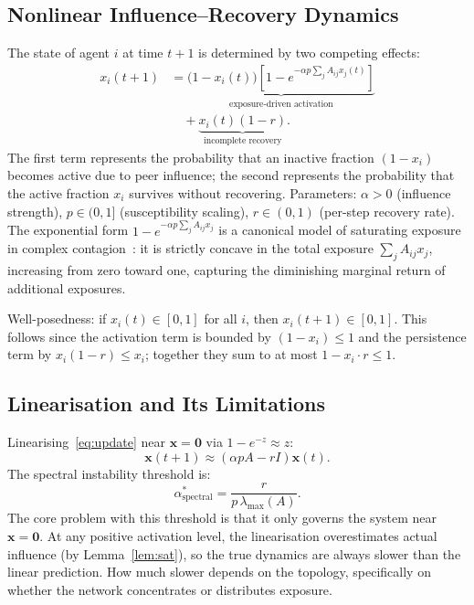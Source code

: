 \documentclass[10pt,twocolumn]{article}
\theoremstyle{myproof}
\newcommand{\lmax}{\lambda_{\max}}
\begin{document}
\subsection{Nonlinear Influence--Recovery Dynamics}
\label{ssec:dynamics}
The state of agent $i$ at time $t+1$ is determined by two competing effects:
\begin{align}
\label{eq:update}
  x_i(t{+}1)&=\underbrace{\bigl(1-x_i(t)\bigr)\!\left[1-e^{-\alpha p\sum_j A_{ij}x_j(t)}\right]}_{\text{exposure-driven activation}} \nonumber\\
  &\quad+\underbrace{x_i(t)(1-r)}_{\text{incomplete recovery}}.
\end{align}
The first term represents the probability that an inactive fraction $(1-x_i)$ becomes active due
to peer influence; the second represents the probability that the active fraction $x_i$ survives
without recovering. Parameters: $\alpha>0$ (influence strength), $p\in(0,1]$ (susceptibility
scaling), $r\in(0,1)$ (per-step recovery rate). The exponential form
$1-e^{-\alpha p\sum_j A_{ij}x_j}$ is a canonical model of saturating exposure in complex
contagion~\cite{centola2007,dodds2004}: it is strictly concave in the total exposure
$\sum_j A_{ij}x_j$, increasing from zero toward one, capturing the diminishing marginal return
of additional exposures.

Well-posedness: if $x_i(t)\in[0,1]$ for all $i$, then $x_i(t+1)\in[0,1]$. This follows since
the activation term is bounded by $(1-x_i)\leq 1$ and the persistence term by $x_i(1-r)\leq x_i$;
together they sum to at most $1-x_i\cdot r\leq 1$.

\subsection{Linearisation and Its Limitations}
Linearising~\eqref{eq:update} near $\mathbf{x}=\mathbf{0}$ via $1-e^{-z}\approx z$:
\begin{equation}
\label{eq:linear}
  \mathbf{x}(t+1)\approx(\alpha p A-rI)\mathbf{x}(t).
\end{equation}
The spectral instability threshold is:
\begin{equation}
\label{eq:spectral_thresh}
  \alpha^*_{\mathrm{spectral}}=\frac{r}{p\,\lmax(A)}.
\end{equation}
The core problem with this threshold is that it only governs the system near $\mathbf{x}=\mathbf{0}$.
At any positive activation level, the linearisation overestimates actual influence (by
Lemma~\ref{lem:sat}), so the true dynamics are always slower than the linear prediction. How much
slower depends on the topology, specifically on whether the network concentrates or distributes
exposure.
\end{document}
